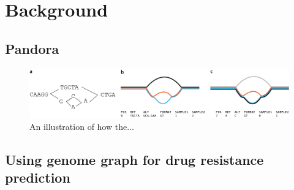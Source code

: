 \chapter{Background}


\section{Pandora}
\label{sec:pandora-intro}


\begin{figure}
\begin{center}
\includegraphics[width=0.95\columnwidth]{Chapter0/Figs/variant_representation.png}
\caption{{An illustration of how the...
{\label{fig:var-representation}}
}}
\end{center}
\end{figure}



\section{Using genome graph for drug resistance prediction}
\label{sec:genome-graphs-dst}

